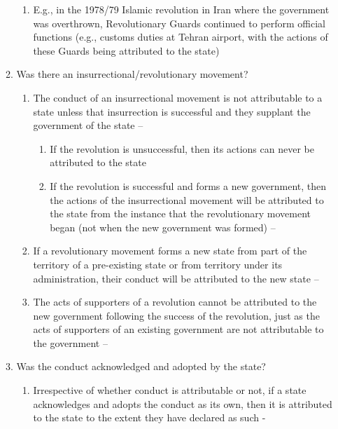 \begin{enumerate}
\begin{enumerate}
\begin{enumerate}
            \item E.g., in the 1978/79 Islamic revolution in Iran where the government was overthrown, Revolutionary Guards continued to perform official functions (e.g., customs duties at Tehran airport, with the actions of these Guards being attributed to the state)
        \end{enumerate}
        \item Was there an insurrectional/revolutionary movement?
        \begin{enumerate}
            \item The conduct of an insurrectional movement is not attributable to a state unless that insurrection is successful and they supplant the government of the state -- 
            \begin{enumerate}
                \item If the revolution is unsuccessful, then its actions can never be attributed to the state
                \item If the revolution is successful and forms a new government, then the actions of the insurrectional movement will be attributed to the state from the instance that the revolutionary movement began (not when the new government was formed) -- 
            \end{enumerate}
            \item If a revolutionary movement forms a new state from part of the territory of a pre-existing state or from territory under its administration, their conduct will be attributed to the new state -- 
            \item The acts of supporters of a revolution cannot be attributed to the new government following the success of the revolution, just as the acts of supporters of an existing government are not attributable to the government -- 
        \end{enumerate}
        \item Was the conduct acknowledged and adopted by the state?
        \begin{enumerate}
            \item Irrespective of whether conduct is attributable or not, if a state acknowledges and adopts the conduct as its own, then it is attributed to the state to the extent they have declared as such - 

\end{enumerate}
\end{enumerate}
\end{enumerate}

